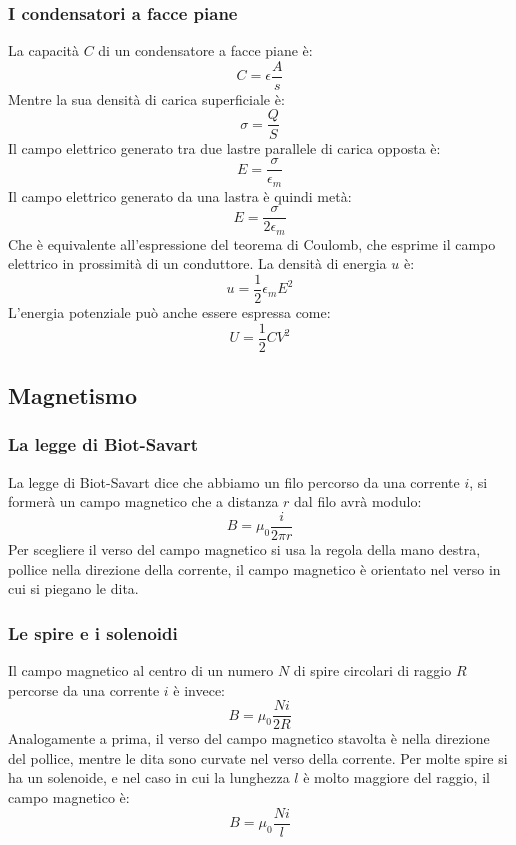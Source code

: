 \documentclass{article}
\begin{document}
\subsubsection{I condensatori a facce piane}
La capacità $C$ di un condensatore a facce piane è:
\begin{equation}
    C=\epsilon\frac{A}{s}
\end{equation}
Mentre la sua densità di carica superficiale è:
\begin{equation}
    \sigma=\frac{Q}{S}
\end{equation}
Il campo elettrico generato tra due lastre parallele di carica opposta è:
\begin{equation}
    E=\frac{\sigma}{\epsilon_m}
\end{equation}
Il campo elettrico generato da una lastra è quindi metà:
\begin{equation}
    E=\frac{\sigma}{2\epsilon_m}
\end{equation}
Che è equivalente all'espressione del teorema di Coulomb, che esprime il campo elettrico in prossimità di un conduttore.
La densità di energia $u$ è:
\begin{equation}
    u=\frac{1}{2}\epsilon_m E^2
\end{equation}
L'energia potenziale può anche essere espressa come:
\begin{equation}
    U=\frac{1}{2}CV^2
\end{equation}


\subsection{Magnetismo}
\subsubsection{La legge di Biot-Savart}
La legge di Biot-Savart dice che abbiamo un filo percorso da una corrente $i$, si formerà un campo magnetico che a distanza $r$ dal filo avrà modulo:
\begin{equation}
    B=\mu_0 \frac{i}{2\pi r}
\end{equation}
Per scegliere il verso del campo magnetico si usa la regola della mano destra, pollice nella direzione della corrente, il campo magnetico è orientato nel verso in cui si piegano le dita.

\subsubsection{Le spire e i solenoidi}
Il campo magnetico al centro di un numero $N$ di spire circolari di raggio $R$ percorse da una corrente $i$ è invece:
\begin{equation}
    B=\mu_0 \frac{Ni}{2 R}
\end{equation}
Analogamente a prima, il verso del campo magnetico stavolta è nella direzione del pollice, mentre le dita sono curvate nel verso della corrente. Per molte spire si ha un solenoide, e nel caso in cui la lunghezza $l$ è molto maggiore del raggio, il campo magnetico è:
\begin{equation}
    B=\mu_0 \frac{Ni}{l}
\end{equation}
\end{document}
